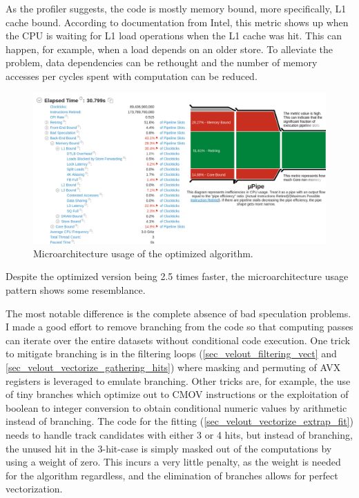 \documentclass[12pt]{article}
\begin{document}
As the profiler suggests, the code is mostly memory bound, more specifically, L1 cache bound. According to documentation from Intel, this metric shows up when the CPU is waiting for L1 load operations when the L1 cache was hit. This can happen, for example, when a load depends on an older store. To alleviate the problem, data dependencies can be rethought and the number of memory accesses per cycles spent with computation can be reduced.\cite{intel_vtune_docs}

\begin{figure}[H]
	\begin{center}
		\includegraphics[width=\textwidth]{velout_uarch_overall_opt}
	\end{center}
	\caption{Microarchitecture usage of the optimized algorithm.}
	\label{fig_velout_uarch_overall_opt}
\end{figure}

Despite the optimized version being 2.5 times faster, the microarchitecture usage pattern shows some resemblance.

The most notable difference is the complete absence of bad speculation problems. I made a good effort to remove branching from the code so that computing passes can iterate over the entire datasets without conditional code execution. One trick to mitigate branching is in the filtering loops (\ref{sec_velout_filtering_vect} and \ref{sec_velout_vectorize_gathering_hits}) where masking and permuting of AVX registers is leveraged to emulate branching. Other tricks are, for example, the use of tiny branches which optimize out to CMOV instructions or the exploitation of boolean to integer conversion to obtain conditional numeric values by arithmetic instead of branching. The code for the fitting (\ref{sec_velout_vectorize_extrap_fit}) needs to handle track candidates with either 3 or 4 hits, but instead of branching, the unused hit in the 3-hit-case is simply masked out of the computations by using a weight of zero. This incurs a very little penalty, as the weight is needed for the algorithm regardless, and the elimination of branches allows for perfect vectorization.
\end{document}
